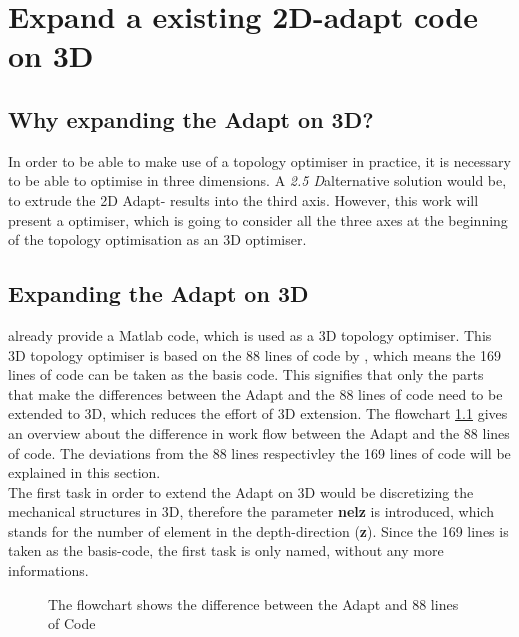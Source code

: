 \chapter{Expand a existing 2D-adapt code on 3D}
\section{Why expanding the Adapt on 3D?}
In order to be able to make use of a topology optimiser in practice, 
it is necessary to be able to optimise in three dimensions. A \textit{2.5 D}alternative solution would be, to extrude the 2D Adapt- results into the third axis. However, this work 
will present a optimiser, which is going to consider all the three axes at the beginning of the topology optimisation as an 3D optimiser.

\section{Expanding the Adapt on 3D}
\cite{Liu.2014} already provide a Matlab code, which is used as a 3D topology optimiser. This 3D topology optimiser is based on the 88 lines of code by \cite{Andreassen.2011}, which
 means the 169 lines of code \cite{Liu.2014} can be taken as the basis code.
This signifies that only the parts
that make the differences between the Adapt 
and the 88 lines of code need to be extended to 3D, which reduces the 
effort of 3D extension.
 The flowchart \ref{fig_flow_88_adal}  gives an overview about the difference in work flow between the Adapt and the 88 lines of code.
 The deviations from the 88 lines respectivley the 169 lines of code will
 be explained in this section. \\

The first task in order to extend the Adapt on 3D would be discretizing
 the mechanical structures in 3D, therefore the parameter \textbf{nelz} is introduced, which stands for the number of element in the depth-direction (\textbf{z}). Since the 169 lines \cite{Liu.2014} is taken as the
 basis-code, the first task is only named, without any more informations.  \\

\begin{figure}[!h]
 \def\svgwidth{\textwidth}
 
 \caption{The flowchart shows the difference between the Adapt and 88 lines of Code}  
 \label{fig_flow_88_adal}          %
 \end{figure}
 
